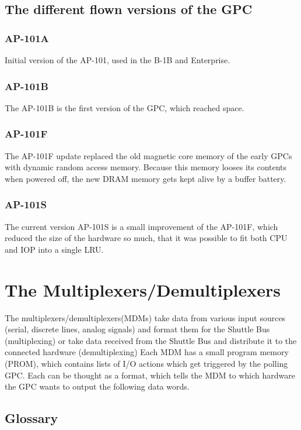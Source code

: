 \documentclass[a4paper, twocolumn, 11pt]{book}
\begin{document}
\section{The different flown versions of the GPC}
\subsection{AP-101A}
Initial version of the AP-101, used in the B-1B and Enterprise.
\subsection{AP-101B}
The AP-101B is the first version of the GPC, which reached
space.
\subsection{AP-101F}
The AP-101F update replaced the old magnetic core memory
of the early GPCs with dynamic random access memory. Because this memory looses
its contents when powered off, the new DRAM memory gets kept alive by a buffer battery.

\subsection{AP-101S}
The current version AP-101S is a small improvement of the
AP-101F, which reduced the size of the hardware so much, that it was possible to
fit both CPU and IOP into a single LRU.
\chapter{The Multiplexers/Demultiplexers}
The multiplexers/demultiplexers(MDMs) take data from various input sources (serial,
discrete lines, analog signals) and format them for the Shuttle Bus
(multiplexing) or take data
received from the Shuttle Bus and distribute it to the connected hardware
(demultiplexing)
Each MDM has a small program memory (PROM), which contains lists of I/O actions
which get triggered by the polling GPC. Each can be thought as a format, which
tells the MDM to which hardware the GPC wants to output the following data
words.

\begin{appendix}
\chapter{Glossary}

\end{appendix}
\printindex
\end{document}
